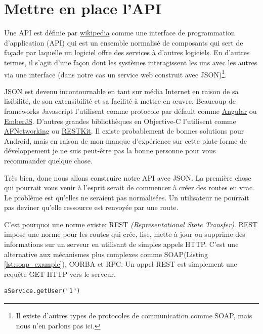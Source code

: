 \documentclass[]{report}
\begin{document}
  \section{Mettre en place l'API}\label{section:setup_api}

    Une API est définie par \href{https://fr.wikipedia.org/wiki/Interface_de_programmation}{wikipedia} comme une interface de programmation d'application (API) qui  est un ensemble normalisé de composants qui sert de façade par laquelle un logiciel offre des services à d'autres logiciels. En d'autres termes, il s'agit d'une façon dont les systèmes interagissent les uns avec les autres via une interface (dans notre cas un service web construit avec JSON)\footnote{Il existe d'autres types de protocoles de communication comme SOAP, mais nous n'en parlons pas ici.}.

    JSON est devenu incontournable en tant sur média Internet en raison de sa lisibilité, de son extensibilité et sa facilité à mettre en œuvre. Beaucoup de frameworks Javascript l'utilisent comme protocole par défault comme \href{https://angularjs.org/}{Angular} ou \href{http://emberjs.com/}{EmberJS}. D'autres grandes bibliothèques en Objective-C l'utilisent  comme \href{https://github.com/AFNetworking/AFNetworking}{AFNetworking} ou \href{http://restkit.org/}{RESTKit}. Il existe probablement de bonnes solutions pour Android, mais en raison de mon manque d'expérience sur cette plate-forme de développement je ne suis peut-être pas la bonne personne pour vous recommander quelque chose.

    Très bien, donc nous allons construire notre API avec JSON. La première chose qui pourrait vous venir à l'esprit serait de commencer à créer des routes en vrac. Le problème est qu'elles ne seraient pas normalisées. Un utilisateur ne pourrait pas deviner qu'elle ressource est renvoyée par une route.

    C'est pourquoi une norme existe: REST \textit{(Representational State Transfer)}. REST impose une norme pour les routes qui crée, lise, mette à jour ou supprime des informations sur un serveur en utilisant de simples appels HTTP. C'est une alternative aux mécanismes plus complexes comme SOAP(Listing \ref{lst:soap_example}), CORBA et RPC. Un appel REST est simplement une requête GET HTTP vers le serveur.

    \begin{scriptsize}
      \begin{lstlisting}[label={lst:soap_example}, caption={Un exemple d'appel SOAP}]
      aService.getUser("1")
      \end{lstlisting}
    \end{scriptsize}
\end{document}
